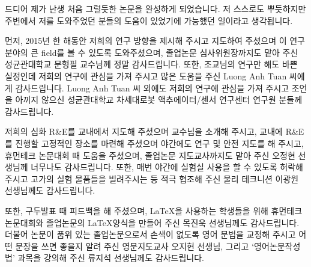 \clearpage




\begin{acknowledgements}
드디어 제가 난생 처음 그럴듯한 논문을 완성하게 되었습니다. 저 스스로도 뿌듯하지만 주변에서 저를 도와주었던 분들의 도움이 있었기에 가능했던 일이라고 생각됩니다.

먼저, 2015년 한 해동안 저희의 연구 방향을 제시해 주시고 지도하여 주셨으며 이 연구 분야의 큰 field를 볼 수 있도록 도와주셨으며, 졸업논문 심사위원장까지도 맡아 주신 성균관대학교 문형필 교수님께 정말 감사드립니다. 또한, 조교님의 연구만 해도 바쁜 실정인데 저희의 연구에 관심을 가져 주시고 많은 도움을 주신 Luong Anh Tuan 씨에게 감사드립니다. Luong Anh Tuan 씨 외에도 저희의 연구에 관심을 가져 주시고 조언을 아끼지 않으신 성균관대학교 차세대로봇 액추에이터/센서 연구센터 연구원 분들께 감사드립니다.

저희의 심화 R\&E를 교내에서 지도해 주셨으며 교수님을 소개해 주시고, 교내에 R\&E를 진행할 고정적인 장소를 마련해 주셨으며 야간에도 연구 및 안전 지도를 해 주시고, 휴먼테크 논문대회 때 도움을 주셨으며, 졸업논문 지도교사까지도 맡아 주신 오정현 선생님께 너무나도 감사드립니다. 또한, 매번 야간에 실험실 사용을 할 수 있도록 허락해 주시고 고가의 실험 물품들을 빌려주시는 등 적극 협조해 주신 물리 테크니션 이광원 선생님께도 감사드립니다.

또한, 구두발표 때 피드백을 해 주셨으며, \LaTeX 을 사용하는 학생들을 위해 휴먼테크논문대회와 졸업논문의 \LaTeX 양식을 만들어 주신 목진욱 선생님께도 감사드립니다. %
더불어 논문이 품위 있는 졸업논문으로서 손색이 없도록 영어 문법을 교정해 주시고 어떤 문장을 쓰면 좋을지 알려 주신 영문지도교사 오지현 선생님, 그리고 `영어논문작성법' 과목을 강의해 주신 류지석 선생님께도 감사드립니다.


\end{acknowledgements}
